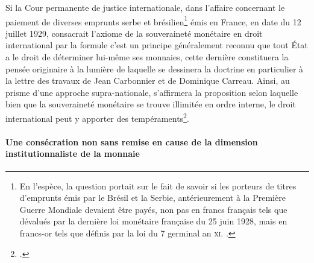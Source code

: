 {Si la Cour permanente de justice internationale, dans l'affaire concernant le paiement de diverses emprunts serbe et brésilien\footnote{En l'espèce, la question portait sur le fait de savoir si les porteurs de titres d'emprunts émis par le Brésil et la Serbie, antérieurement à la Première Guerre Mondiale devaient être payés, non pas en francs français tels que dévalués par la dernière loi monétaire française du 25 juin 1928, mais en francs-or tels que définis par la loi du 7 germinal an \textsc{xi}. .} émis en France, en date du 12 juillet 1929, consacrait l'axiome de la souveraineté monétaire en droit international par la formule \og c'est un principe généralement reconnu que tout État a le droit de déterminer lui-même ses monnaies\fg{}, cette dernière constituera la pensée originaire à la lumière de laquelle se dessinera la doctrine en particulier à la lettre des travaux de Jean Carbonnier et de Dominique Carreau. Ainsi, au prisme d'une approche supra-nationale, s'affirmera la proposition selon laquelle bien que la souveraineté monétaire se trouve illimitée en ordre interne, le droit international peut y apporter des tempéraments\footnote{.}.

\paragraph{Une consécration non sans remise en cause de la dimension institutionnaliste de la monnaie}

}
